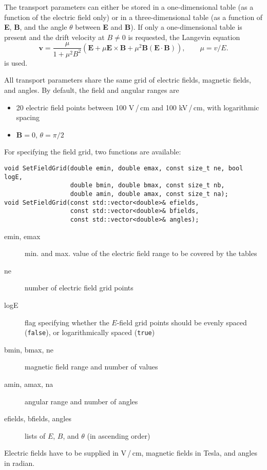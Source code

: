The transport parameters can either be stored in a 
one-dimensional table (as a function of the electric field only) or 
in a three-dimensional table (as a function of \textbf{E}, \textbf{B}, 
and the angle \(\theta\) between \textbf{E} and \textbf{B}). 
If only a one-dimensional table is present and the 
drift velocity at \(B \ne 0\) is requested, the Langevin equation
\cite{BlumRieglerRolandi2008}
\begin{equation*}
  \mathbf{v} = \frac{\mu}{1 + \mu^2 B^2} \left(
  \mathbf{E} + \mu \mathbf{E} \times \mathbf{B} + 
  \mu^2 \mathbf{B} \left(\mathbf{E} \cdot \mathbf{B}\right)\right), \qquad 
  \mu = v / E. 
\end{equation*} 
is used. 

All transport parameters share the same grid 
of electric fields, magnetic fields, and angles.
By default, the field and angular ranges are
\begin{itemize}
  \item
  20 electric field points between 100 V\,/\,cm and 100 kV\,/\,cm, 
  with logarithmic spacing
  \item
  \(\mathbf{B} = 0\), \(\theta = \pi / 2\)
\end{itemize}

For specifying the field grid, two functions are available:
\begin{lstlisting}
void SetFieldGrid(double emin, double emax, const size_t ne, bool logE,
                  double bmin, double bmax, const size_t nb,
                  double amin, double amax, const size_t na);
void SetFieldGrid(const std::vector<double>& efields,
                  const std::vector<double>& bfields,
                  const std::vector<double>& angles);
\end{lstlisting}
\begin{description}
\item[emin, emax] min. and max. value of the electric field range to be covered by the tables
\item[ne] number of electric field grid points
\item[logE] flag specifying whether the \(E\)-field grid points should be 
evenly spaced (\texttt{false}), or logarithmically spaced (\texttt{true}) 
\item[bmin, bmax, ne] magnetic field range and number of values
\item[amin, amax, na] angular range and number of angles
\item[efields, bfields, angles] lists of \(E\), \(B\), and 
\(\theta\) (in ascending order)
\end{description}
Electric fields have to be supplied in V\,/\,cm, magnetic fields in Tesla, 
and angles in radian.

